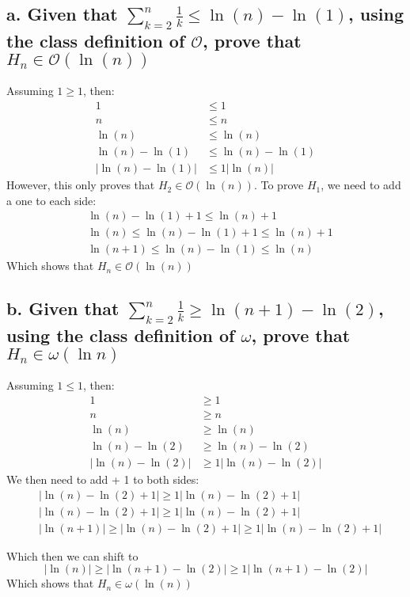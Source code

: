 \documentclass{article}
\begin{document}
\subsection*{a. Given that \(\sum_{k=2}^n \frac{1}{k} \leq \ln{(n)} - \ln{(1)}\), using the class definition of \(\mathcal{O}\), prove that \(H_n \in \mathcal{O}(\ln{(n)})\)}
Assuming \(1 \geq 1\), then:
\begin{align}
1 &\leq 1\\
n &\leq n\\
\ln{(n)} &\leq \ln{(n)}\\
\ln{(n)} - \ln{(1)} &\leq \ln{(n)} - \ln{(1)}\\
|\ln{(n)} - \ln{(1)}| &\leq 1|\ln{(n)}|
\end{align}
However, this only proves that \(H_2 \in \mathcal{O}(\ln{(n)})\). To prove \(H_1\), we need to add a one to each side:
\begin{align}
&\ln{(n)} - \ln{(1)} + 1 \leq \ln{(n)} + 1\\
&\ln{(n)} \leq \ln{(n)} - \ln{(1)} + 1 \leq \ln{(n)} + 1\\
&\ln{(n + 1)} \leq \ln{(n)} - \ln{(1)} \leq \ln{(n)}
\end{align}
Which shows that \(H_n \in \mathcal{O}(\ln{(n)})\)

\subsection*{b. Given that \(\sum_{k=2}^n \frac{1}{k} \geq \ln{(n + 1)} - \ln{(2)}\), using the class definition of \(\mathcal{\omega}\), prove that \(H_n \in \mathcal{\omega}(\ln{n})\)}
Assuming \(1 \leq 1\), then:
\begin{align}
1 &\geq 1\\
n &\geq n\\
\ln{(n)} &\geq \ln{(n)}\\
\ln{(n)} - \ln{(2)} &\geq \ln{(n)} - \ln{(2)}\\
|\ln{(n)} - \ln{(2)}| &\geq 1|\ln{(n)} - \ln{(2)}|
\end{align}
We then need to add + 1 to both sides:
\begin{align}
&|\ln{(n)} - \ln{(2)} + 1| \geq 1|\ln{(n)} - \ln{(2)} + 1|\\
&|\ln{(n)} - \ln{(2)} + 1| \geq 1|\ln{(n)} - \ln{(2)} + 1|\\
&|\ln{(n + 1)}| \geq |\ln{(n)} - \ln{(2)} + 1| \geq 1|\ln{(n)} - \ln{(2)} + 1|
\end{align}

Which then we can shift to
\[|\ln{(n)}| \geq |\ln{(n + 1)} - \ln{(2)}| \geq 1|\ln{(n + 1)} - \ln{(2)}|\]
Which shows that \(H_n \in \mathcal{\omega}(\ln{(n)})\)
\end{document}

